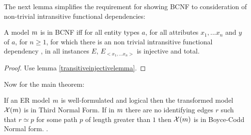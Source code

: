 \noindent The next lemma simplifies the requirement for showing BCNF to consideration of non-trivial
intransitive functional dependencies:
\begin{lemma}
\label{BCNFsublemma}
A model ${m}$ is in BCNF iff
for all entity types $a$, for all attributes $x_1,...x_n$ and $y$ of $a$, for $n \geq 1$, 
for which there is an non trivial intransitive functional dependency ,
in all instances $E$, $E_{<x_1,...x_n>}$ is injective and total. 
\end{lemma}
\begin{proof}Use lemma \ref{transitiveinjectivelemma}.
\end{proof}

\noindent Now for the main theorem:\\
\begin{theorem}
\noindent If an ER model ${m}$ is well-formulated and logical then the 
transformed model $\mathcal{X}({m})$  is in Third Normal Form. If in ${m}$
there are no identifying edges $r$ such that $r \simeq p$ for some path $p$ of length greater than $1$
then $\mathcal{X}({m})$ is in Boyce-Codd Normal form. .
\end{theorem}
